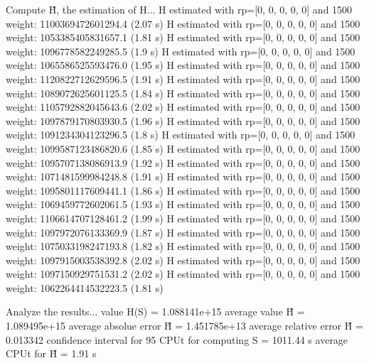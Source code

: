 Compute H̃, the estimation of H...
  H estimated with rp=[0, 0, 0, 0, 0] and 1500 weight:  1100369472601294.4  (2.07 s)
  H estimated with rp=[0, 0, 0, 0, 0] and 1500 weight:  1053385405831657.1  (1.81 s)
  H estimated with rp=[0, 0, 0, 0, 0] and 1500 weight:  1096778582249285.5  (1.9 s)
  H estimated with rp=[0, 0, 0, 0, 0] and 1500 weight:  1065586525593476.0  (1.95 s)
  H estimated with rp=[0, 0, 0, 0, 0] and 1500 weight:  1120822712629596.5  (1.91 s)
  H estimated with rp=[0, 0, 0, 0, 0] and 1500 weight:  1089072625601125.5  (1.84 s)
  H estimated with rp=[0, 0, 0, 0, 0] and 1500 weight:  1105792882045643.6  (2.02 s)
  H estimated with rp=[0, 0, 0, 0, 0] and 1500 weight:  1097879170803930.5  (1.96 s)
  H estimated with rp=[0, 0, 0, 0, 0] and 1500 weight:  1091234304123296.5  (1.8 s)
  H estimated with rp=[0, 0, 0, 0, 0] and 1500 weight:  1099587123486820.6  (1.85 s)
  H estimated with rp=[0, 0, 0, 0, 0] and 1500 weight:  1095707138086913.9  (1.92 s)
  H estimated with rp=[0, 0, 0, 0, 0] and 1500 weight:  1071481599984248.8  (1.91 s)
  H estimated with rp=[0, 0, 0, 0, 0] and 1500 weight:  1095801117609441.1  (1.86 s)
  H estimated with rp=[0, 0, 0, 0, 0] and 1500 weight:  1069459772602061.5  (1.93 s)
  H estimated with rp=[0, 0, 0, 0, 0] and 1500 weight:  1106614707128461.2  (1.99 s)
  H estimated with rp=[0, 0, 0, 0, 0] and 1500 weight:  1097972076133369.9  (1.87 s)
  H estimated with rp=[0, 0, 0, 0, 0] and 1500 weight:  1075033198247193.8  (1.82 s)
  H estimated with rp=[0, 0, 0, 0, 0] and 1500 weight:  1097915003538392.8  (2.02 s)
  H estimated with rp=[0, 0, 0, 0, 0] and 1500 weight:  1097150929751531.2  (2.02 s)
  H estimated with rp=[0, 0, 0, 0, 0] and 1500 weight:  1062264414532223.5  (1.81 s)

Analyze the results...
  value H(S)                  = 1.088141e+15 
  average value H̃             = 1.089495e+15 
  average absolue error H̃     = 1.451785e+13 
  average relative error H̃    = 0.013342 
  confidence interval for 95%
  CPUt for computing S         = 1011.44 s
  average CPUt for H̃           = 1.91 s


